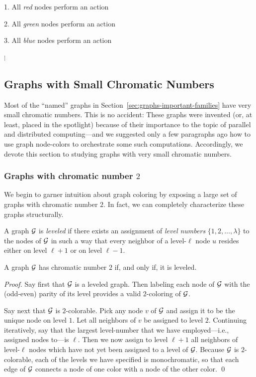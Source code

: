 1. All {\em red} nodes perform an action

2. All {\em green} nodes perform an action

3. All {\em blue} nodes perform an action

\hspace*{1in} $\vdots$


\subsection{Graphs with Small Chromatic Numbers}
\label{sec:Graphs-small-Chromatic-No} 

Most of the ``named'' graphs in
Section~\ref{sec:graphs-important-families} have very small chromatic
numbers.  This is no accident: These graphs were invented (or, at
least, placed in the spotlight) because of their importance to the
topic of parallel and distributed computing---and we suggested only a
few paragraphs ago how to use graph node-colors to orchestrate some
such computations.  Accordingly, we devote this section to studying
graphs with very small chromatic numbers.

\subsubsection{Graphs with chromatic number $2$}
\label{sec:2-color-graphs}

We begin to garner intuition about graph coloring by exposing a large
set of graphs with chromatic number $2$.  In fact, we can completely
characterize these graphs structurally.

A graph $\mbox{$\cal G$}$ is {\it leveled}  if there exists
an assignment of {\it level numbers} $\{ 1, 2, \ldots, \lambda\}$ to the
nodes of $\mbox{$\cal G$}$ in such a way that every neighbor of a level-$\ell$ node
$u$ resides either on level $\ell +1$ or on level $\ell -1$.

\begin{prop}
\label{thm:leveled=2-color}
A graph $\mbox{$\cal G$}$ has chromatic number $2$ if, and only if, it is leveled.
\end{prop}

\begin{proof}
Say first that $\mbox{$\cal G$}$ is a leveled graph.  Then labeling each node of
$\mbox{$\cal G$}$ with the (odd-even) parity of its level provides a valid
$2$-coloring of $\mbox{$\cal G$}$.

Say next that $\mbox{$\cal G$}$ is $2$-colorable.  Pick any node $v$ of $\mbox{$\cal G$}$ and
assign it to be the unique node on level $1$.  Let all neighbors of
$v$ be assigned to level $2$.  Continuing iteratively, say that the
largest level-number that we have employed---i.e., assigned nodes
to---is $\ell$.  Then we now assign to level $\ell +1$ all neighbors
of level-$\ell$ nodes which have not yet been assigned to a level of
$\mbox{$\cal G$}$.  Because $\mbox{$\cal G$}$ is $2$-colorable, each of the levels we have
specified is monochromatic, so that each edge of $\mbox{$\cal G$}$ connects a node
of one color with a node of the other color.  \qed
\end{proof}

